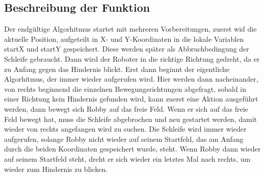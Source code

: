\subsection*{Beschreibung der Funktion}
Der endgültige Algorhitmus startet mit mehreren Vorbereitungen, zuerst wid die aktuelle Position, aufgeteilt in X- und Y-Koordinaten in die lokale Variablen startX und startY gespeichert. Diese werden später als Abbruchbedingung der Schleife gebraucht. Dann wird der Roboter in die richtige Richtung gedreht, da er zu Anfang gegen das Hindernis blickt.
Erst dann beginnt der eigentliche Algorhitmus, der immer wieder aufgerufen wird. Hier werden dann nacheinander, von rechts beginnend die einzelnen Bewegungsrichtungen abgefragt, sobald in einer Richtung kein Hindernis gefunden wird, kann zuerst eine Aktion ausgeführt werden, dann bewegt sich Robby auf das freie Feld. Wenn er sich auf das freie Feld bewegt hat, muss die Schleife abgebrochen und neu gestartet werden, damit wieder von rechts angefangen wird zu suchen. Die Schleife wird immer wieder aufgerufen, solange Robby nicht wieder auf seinem Startfeld, das am Anfang durch die beiden Koordinaten gespeichert wurde, steht.
Wenn Robby dann wieder auf seinem Startfeld steht, dreht er sich wieder ein letztes Mal nach rechts, um wieder zum Hindernis zu blicken.
